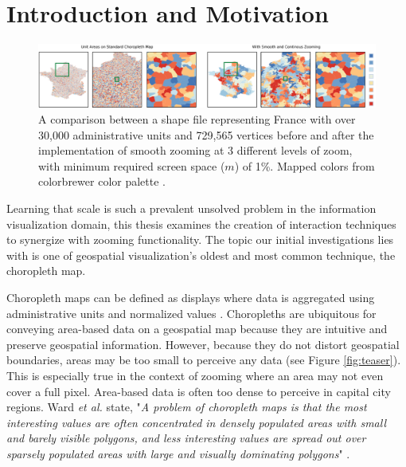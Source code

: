 \section{Introduction and Motivation}
\begin{figure}[ht]
  \centering
  \includegraphics[width=\linewidth]{images/newTeaser}
  \caption{A comparison between a shape file representing France with over 30,000 administrative units and 729,565 vertices before and after the implementation of smooth zooming at 3 different levels of zoom, with minimum required screen space ($m$) of 1\%. Mapped colors from colorbrewer color palette \cite{colorbrewer}.  } \vspace{-0.2cm}
	\label{fig:teaser3}
\end{figure}

Learning that scale is such a prevalent unsolved problem in the information visualization domain, this thesis examines the creation of interaction techniques to synergize with zooming functionality. The topic our initial investigations lies with is one of geospatial visualization's oldest and most common technique, the choropleth map.

Choropleth maps can be defined as displays where data is aggregated using administrative units and normalized values \cite{meirelles2013design}. Choropleths are ubiquitous for conveying area-based data on a geospatial map because they are intuitive and preserve geospatial information. However, because they do not distort geospatial boundaries, areas may be too small to perceive any data (see Figure \ref{fig:teaser}). This is especially true in the context of zooming where an area may not even cover a full pixel. Area-based data is often too dense to perceive in capital city regions. Ward \textit{et al.} state, "\emph{A problem of choropleth maps is that the most interesting values are often concentrated in densely populated areas with small and barely visible polygons, and less interesting values are spread out over sparsely populated areas with large and visually dominating polygons}" \cite{ward2010interactive}.


